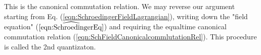 This is the canonical commutation relation.
We may reverse our argument starting from Eq. (\ref{eqn:SchroedingerFieldLagrangian}),
writing down the "field equation" ($\widehat{\ref{eqn:SchroedingerEq}}$) and
requiring the equaltime canonical commutation relation (\ref{eqn:SchFieldCanonicalcommlutationRel}).
This procedure is called the 2nd quantizaton.
\begin{comment}
\begin{eqnarray}
\mbox{Schr\"odinger eq.} \hspace{24mm} 
&\hspace{-5mm}&
\hspace{-20mm}
i \partial_t \Psi(t, \bld{x}) = {H} \Psi(t, \bld{x}) \,,
\hspace{3mm}
H = - \frac{\bld{\partial}^2}{2m} + V(\bld{x}) = H^\dagger
\label{eqn:SchroedingerEq}
\\
\mbox{Eigenstates of } H \hspace{22mm} 
&\hspace{-5mm}&
\hspace{-20mm}
H \varphi_l (\bld{x} ) = \epsilon_l \varphi_l (\bld{x} )\,,
\hspace{3mm}
\{ \varphi_l (\bld{x} ) \} \mbox{: orthogonal, complete}
\label{eqn:energyEigenSt}
\\
\mbox{Solution of the Schr\"odinger eq.}
&\hspace{-5mm}&
\Psi(t, \bld{x})
=
\sum_l \Psi_l e^{-\epsilon_l t} \varphi_l (\bld{x})
\label{eqn:Psiexpansion}
\end{eqnarray}
%
Bras and kets
\begin{equation}
\Psi(t, \bld{x}) = \bra \bld{x} \braend \Psi(t) \ket\,,
\hspace{5mm}
\varphi_l(\bld{x})  = \bra \bld{x} \braend \epsilon_l \ket\,, 
\end{equation}
\begin{equation*}
\hspace{21mm}
i \partial_t  \ketend \Psi(t) \ket = \hat{H} \ketend \Psi(t) \ket\,,
\hspace{5mm}
\hat{H} = \frac{\hat{\bld{p}}^2}{2 m} + V(\bld{x}) = \hat{H}^\dagger
\hspace{20mm}

\end{comment}
